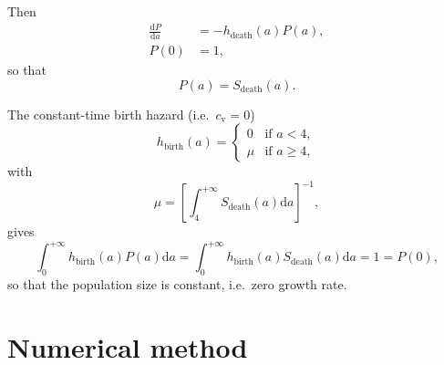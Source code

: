 \documentclass{article}
\newcommand{\md}{\mathrm{d}}
\begin{document}
Then
\begin{subequations}
  \begin{align}
    \frac{\md P}{\md a}
    &= - h_{\text{death}}(a) P(a), \\
    P(0) &= 1,
  \end{align}
\end{subequations}
so that
\begin{equation}
  P(a) = S_{\text{death}}(a).
\end{equation}

The constant-time birth hazard
(i.e.~$c_{\mathrm{v}} = 0$)
\begin{equation}
  h_{\text{birth}}(a) =
  \begin{cases}
    0 & \text{if $a < 4$}, \\
    \mu & \text{if $a \geq 4$},
  \end{cases}
\end{equation}
with
\begin{equation}
  \mu =
  \left[
    \int_4^{+\infty} S_{\text{death}}(a) \md a
  \right]^{-1},
\end{equation}
gives
\begin{equation}
  \int_0^{+\infty} h_{\text{birth}}(a) P(a) \md a
  = \int_0^{+\infty} h_{\text{birth}}(a) S_{\text{death}}(a) \md a
  = 1
  = P(0),
\end{equation}
so that the population size is constant, i.e.~zero growth rate.


\section{Numerical method}
\end{document}
